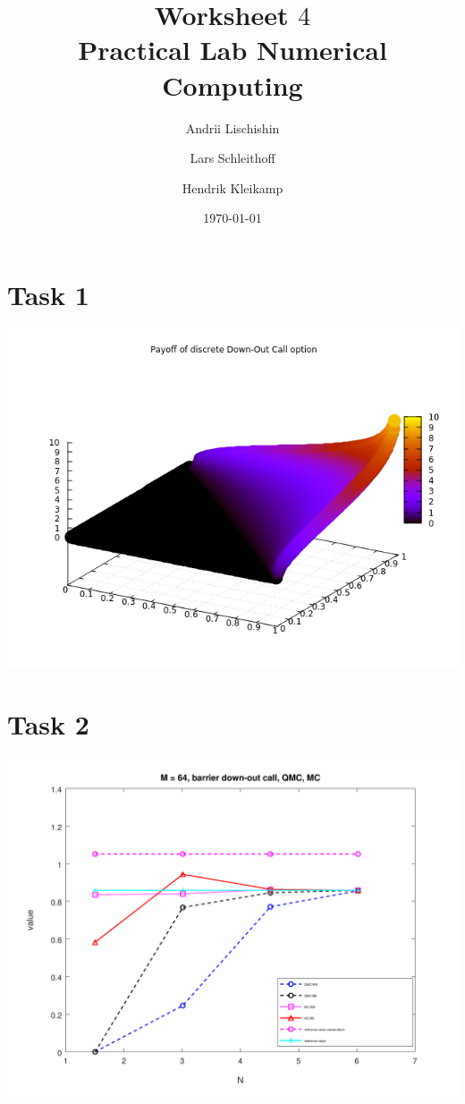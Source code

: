 \documentclass[10pt,a4paper]{article}
\begin{document}
\title{Worksheet $4$\\
\small{Practical Lab Numerical Computing}}
\author{Andrii Lischishin \and Lars Schleithoff \and Hendrik Kleikamp}
\date{\today}
\maketitle

\section*{Task 1}

\begin{center}
	\includegraphics[scale=0.7]{payoff_down_out_call.png}
\end{center}

\section*{Task 2}


\begin{center}
	\includegraphics[scale=0.3]{images/task2.png}
\end{center}
\end{document}
